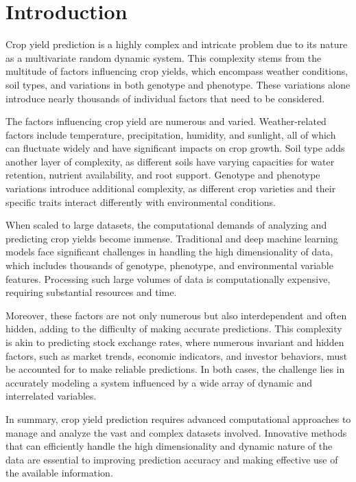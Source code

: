 \section*{Introduction}
Crop yield prediction is a highly complex and intricate problem due to its nature as a multivariate random dynamic system. This complexity stems from the multitude of factors influencing crop yields, which encompass weather conditions, soil types, and variations in both genotype and phenotype. These variations alone introduce nearly thousands of individual factors that need to be considered.

The factors influencing crop yield are numerous and varied. Weather-related factors include temperature, precipitation, humidity, and sunlight, all of which can fluctuate widely and have significant impacts on crop growth. Soil type adds another layer of complexity, as different soils have varying capacities for water retention, nutrient availability, and root support. Genotype and phenotype variations introduce additional complexity, as different crop varieties and their specific traits interact differently with environmental conditions.

When scaled to large datasets, the computational demands of analyzing and predicting crop yields become immense. Traditional and deep machine learning models face significant challenges in handling the high dimensionality of data, which includes thousands of genotype, phenotype, and environmental variable features. Processing such large volumes of data is computationally expensive, requiring substantial resources and time.

Moreover, these factors are not only numerous but also interdependent and often hidden, adding to the difficulty of making accurate predictions. This complexity is akin to predicting stock exchange rates, where numerous invariant and hidden factors, such as market trends, economic indicators, and investor behaviors, must be accounted for to make reliable predictions. In both cases, the challenge lies in accurately modeling a system influenced by a wide array of dynamic and interrelated variables.

In summary, crop yield prediction requires advanced computational approaches to manage and analyze the vast and complex datasets involved. Innovative methods that can efficiently handle the high dimensionality and dynamic nature of the data are essential to improving prediction accuracy and making effective use of the available information.
